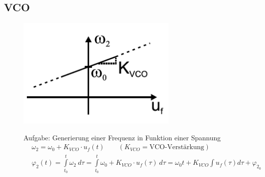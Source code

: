 \subsection{VCO } 
\label{Kap.VCO}
\vspace{-0.7cm}
\begin{figure}[h!]
	\begin{minipage}{0.3\textwidth} 
       \includegraphics[width=0.7\textwidth]{images/K_VCO}
	\end{minipage}
	\begin{minipage}{0.6\textwidth}
	Aufgabe: Generierung einer Frequenz in Funktion einer Spannung
	   \begin{equation*}
         \begin{split}
            &\omega_2 = \omega_0+K_{VCO}\cdot u_f(t) \quad \quad (K_{VCO}=\text{VCO-Verstärkung})  \\
            &\varphi_2(t) =\int \limits_{t_0}^{t} \omega_2 \ d\tau =\int \limits_{t_0}^{t} \omega _0 + K_{VCO}\cdot u_f (\tau)\ d \tau =\omega_0 t + K_{VCO} \int \limits_{}^{} u_f(\tau) d\tau +\varphi_2_0 \\
         \end{split}
        \end{equation*}
	\end{minipage}
\end{figure}
\vspace{-0.7cm}

